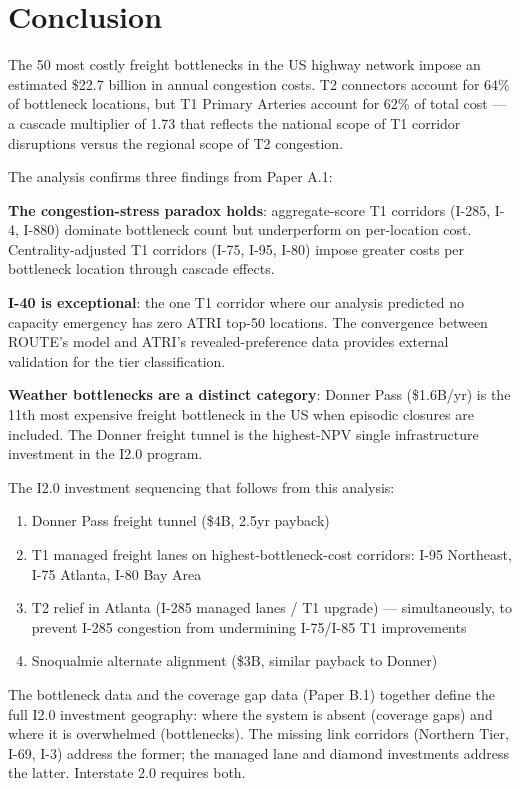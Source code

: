 \section{Conclusion}

The 50 most costly freight bottlenecks in the US highway network impose an estimated \$22.7 billion in annual congestion costs. T2 connectors account for 64\% of bottleneck locations, but T1 Primary Arteries account for 62\% of total cost --- a cascade multiplier of 1.73 that reflects the national scope of T1 corridor disruptions versus the regional scope of T2 congestion.

The analysis confirms three findings from Paper A.1:

\textbf{The congestion-stress paradox holds}: aggregate-score T1 corridors (I-285, I-4, I-880) dominate bottleneck count but underperform on per-location cost. Centrality-adjusted T1 corridors (I-75, I-95, I-80) impose greater costs per bottleneck location through cascade effects.

\textbf{I-40 is exceptional}: the one T1 corridor where our analysis predicted no capacity emergency has zero ATRI top-50 locations. The convergence between ROUTE's model and ATRI's revealed-preference data provides external validation for the tier classification.

\textbf{Weather bottlenecks are a distinct category}: Donner Pass (\$1.6B/yr) is the 11th most expensive freight bottleneck in the US when episodic closures are included. The Donner freight tunnel is the highest-NPV single infrastructure investment in the I2.0 program.

The I2.0 investment sequencing that follows from this analysis:
\begin{enumerate}
\item Donner Pass freight tunnel (\$4B, 2.5yr payback)
\item T1 managed freight lanes on highest-bottleneck-cost corridors: I-95 Northeast, I-75 Atlanta, I-80 Bay Area
\item T2 relief in Atlanta (I-285 managed lanes / T1 upgrade) — simultaneously, to prevent I-285 congestion from undermining I-75/I-85 T1 improvements
\item Snoqualmie alternate alignment (\$3B, similar payback to Donner)
\end{enumerate}

The bottleneck data and the coverage gap data (Paper B.1) together define the full I2.0 investment geography: where the system is absent (coverage gaps) and where it is overwhelmed (bottlenecks). The missing link corridors (Northern Tier, I-69, I-3) address the former; the managed lane and diamond investments address the latter. Interstate 2.0 requires both.
